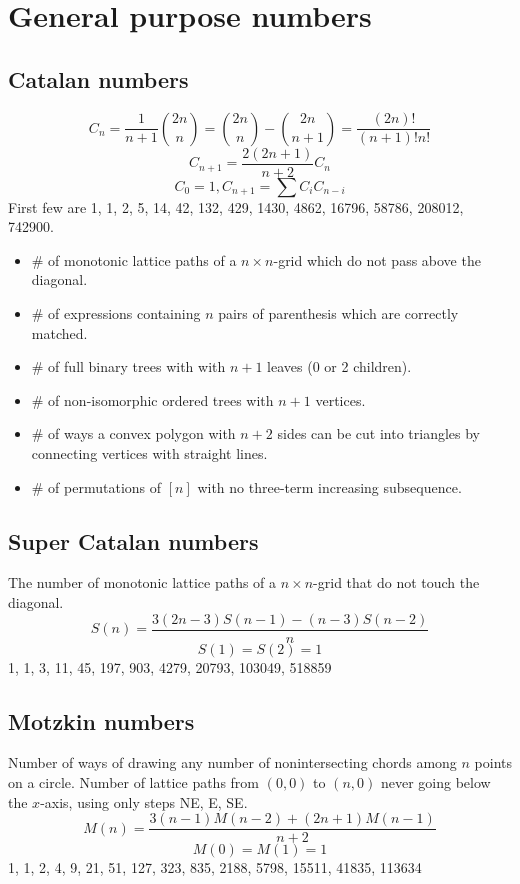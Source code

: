 \section{General purpose numbers}
	\subsection{Catalan numbers}
		$$C_n=\frac{1}{n+1}\binom{2n}{n}= \binom{2n}{n}-\binom{2n}{n+1} = \frac{(2n)!}{(n+1)!n!}$$
		$$C_{n+1} = \frac{2(2n+1)}{n+2}C_n$$
		$$C_0=1, C_{n+1}=\sum C_iC_{n-i}$$
		First few are 1, 1, 2, 5, 14, 42, 132, 429, 1430, 4862, 16796, 58786, 208012, 742900.
		\begin{itemize}
			\setlength\itemsep{0pt}
			\item \# of monotonic lattice paths of a $n\times n$-grid which do not pass above the diagonal.
			\item \# of expressions containing $n$ pairs of parenthesis which are correctly matched.
			\item \# of full binary trees with with $n+1$ leaves (0 or 2 children).
			\item \# of non-isomorphic ordered trees with $n+1$ vertices.
			\item \# of ways a convex polygon with $n+2$ sides can be cut into triangles by connecting vertices with straight lines.
			\item \# of permutations of $[n]$ with no three-term increasing subsequence.
		\end{itemize}

	\subsection{Super Catalan numbers}
		The number of monotonic lattice paths of a $n\times n$-grid that do not touch the diagonal.
		$$S(n) = \frac{3(2n-3)S(n-1)-(n-3)S(n-2)}{n}$$
		$$S(1)=S(2)=1$$
		1, 1, 3, 11, 45, 197, 903, 4279, 20793, 103049, 518859

	\subsection{Motzkin numbers}
		Number of ways of drawing any number of nonintersecting chords among $n$ points on a circle. Number of lattice paths from $(0,0)$ to $(n,0)$ never going below the $x$-axis, using only steps NE, E, SE.
		$$M(n) = \frac{3(n-1)M(n-2)+(2n+1)M(n-1)}{n+2}$$
		$$M(0) = M(1) = 1$$
		1, 1, 2, 4, 9, 21, 51, 127, 323, 835, 2188, 5798, 15511, 41835, 113634

